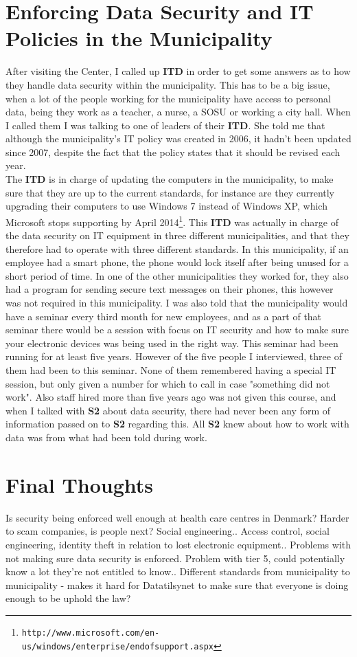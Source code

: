 \documentclass[11pt]{article}
\begin{document}
\section{Enforcing Data Security and IT Policies in the Municipality}
After visiting the Center, I called up \textbf{ITD} in order to get some answers as to how they handle data security within the municipality. This has to be a big issue, when a lot of the people working for the municipality have access to personal data, being they work as a teacher, a nurse, a SOSU or working a city hall. 
When I called them I was talking to one of leaders of their \textbf{ITD}. She told me that although the municipality's IT policy was created in 2006, it hadn't been updated since 2007, despite the fact that the policy states that it should be revised each year.\\
The \textbf{ITD} is in charge of updating the computers in the municipality, to make sure that they are up to the current standards, for instance are they currently upgrading their computers to use Windows 7 instead of Windows XP, which Microsoft stops supporting by April 2014\footnote{ \texttt{http://www.microsoft.com/en-us/windows/enterprise/endofsupport.aspx} }.
This \textbf{ITD} was actually in charge of the data security on IT equipment in three different municipalities, and that they therefore had to operate with three different standards. In this municipality, if an employee had a smart phone, the phone would lock itself after being unused for a short period of time. In one of the other municipalities they worked for, they also had a program for sending secure text messages on their phones, this however was not required in this municipality.
I was also told that the municipality would have a seminar every third month for new employees, and as a part of that seminar there would be a session with focus on IT security and how to make sure your electronic devices was being used in the right way. This seminar had been running for at least five years. However of the five people I interviewed, three of them had been to this seminar. None of them remembered having a special IT session, but only given a number for which to call in case "something did not work". Also staff hired more than five years ago was not given this course, and when I talked with \textbf{S2} about data security, there had never been any form of information passed on to \textbf{S2} regarding this. All \textbf{S2} knew about how to work with data was from what had been told during work.
\section{Final Thoughts}
Is security being enforced well enough at health care centres in Denmark?
Harder to scam companies, is people next? Social engineering..
Access control, social engineering, identity theft in relation to lost electronic equipment..
Problems with not making sure data security is enforced.
Problem with tier 5, could potentially know a lot they're not entitled to know..
Different standards from municipality to municipality - makes it hard for Datatilsynet to make sure that everyone is doing enough to be uphold the law?
\end{document}
